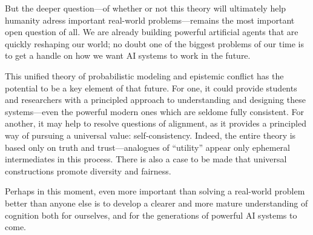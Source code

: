 
But the deeper question---of whether or not this theory will ultimately help humanity adress important real-world problems---remains the most important open question of all.
We are already building powerful artificial agents that are quickly reshaping our world; no doubt one of the biggest problems of our time is to get a handle on how we want AI systems to work in the future.  


This unified theory of probabilistic modeling and epistemic conflict has the potential to be a key element of that future.
For one, it could provide students and researchers with a principled approach to understanding and designing these systems---even the powerful modern ones which are seldome fully consistent. 
For another, it may help to resolve questions of alignment, as it provides a principled way of pursuing a universal value: self-consistency. 
Indeed, the entire theory is based only on truth and trust---analogues of ``utility'' appear only ephemeral intermediates in this process. 
There is also a case to be made that universal constructions promote diversity and fairness.

Perhaps in this moment, even more important than 
    solving a real-world problem better than anyone else
is to develop a clearer and more mature understanding
    of cognition both for ourselves,
    and for the generations of powerful AI systems to come.


